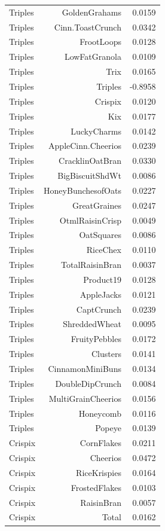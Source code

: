 \begin{longtable}{@{}lrr@{}}
Triples & GoldenGrahams & 0.0159 \\
Triples & Cinn.ToastCrunch & 0.0342 \\
Triples & FrootLoops & 0.0128 \\
Triples & LowFatGranola & 0.0109 \\
Triples & Trix & 0.0165 \\
Triples & Triples & -0.8958 \\
Triples & Crispix & 0.0120 \\
Triples & Kix & 0.0177 \\
Triples & LuckyCharms & 0.0142 \\
Triples & AppleCinn.Cheerios & 0.0239 \\
Triples & CracklinOatBran & 0.0330 \\
Triples & BigBiscuitShdWt & 0.0086 \\
Triples & HoneyBunchesofOats & 0.0227 \\
Triples & GreatGraines & 0.0247 \\
Triples & OtmlRaisinCrisp & 0.0049 \\
Triples & OatSquares & 0.0086 \\
Triples & RiceChex & 0.0110 \\
Triples & TotalRaisinBran & 0.0037 \\
Triples & Product19 & 0.0128 \\
Triples & AppleJacks & 0.0121 \\
Triples & CaptCrunch & 0.0239 \\
Triples & ShreddedWheat & 0.0095 \\
Triples & FruityPebbles & 0.0172 \\
Triples & Clusters & 0.0141 \\
Triples & CinnamonMiniBuns & 0.0134 \\
Triples & DoubleDipCrunch & 0.0084 \\
Triples & MultiGrainCheerios & 0.0156 \\
Triples & Honeycomb & 0.0116 \\
Triples & Popeye & 0.0139 \\
Crispix & CornFlakes & 0.0211 \\
Crispix & Cheerios & 0.0472 \\
Crispix & RiceKrispies & 0.0164 \\
Crispix & FrostedFlakes & 0.0103 \\
Crispix & RaisinBran & 0.0057 \\
Crispix & Total & 0.0162 \\

\end{longtable}
